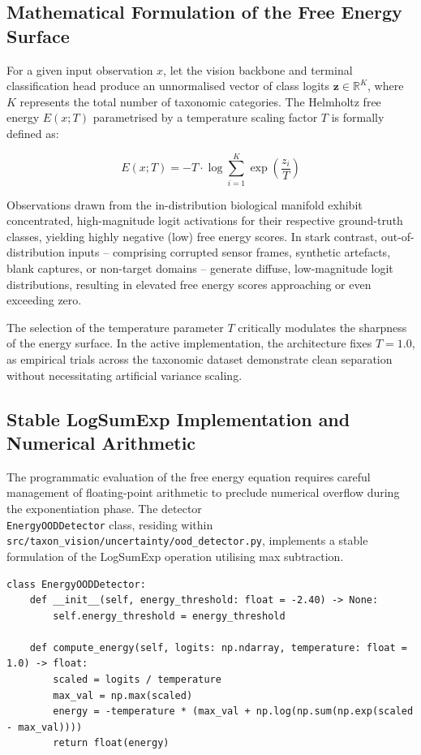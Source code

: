 \subsection{Mathematical Formulation of the Free Energy Surface}

For a given input observation $x$, let the vision backbone and terminal classification head produce an unnormalised vector of class logits $\mathbf{z} \in \mathbb{R}^K$, where $K$ represents the total number of taxonomic categories. The Helmholtz free energy $E(x; T)$ parametrised by a temperature scaling factor $T$ is formally defined as:

\begin{equation}
    E(x; T) = -T \cdot \log \sum_{i=1}^K \exp\left(\frac{z_i}{T}\right)
\end{equation}

Observations drawn from the in-distribution biological manifold exhibit concentrated, high-magnitude logit activations for their respective ground-truth classes, yielding highly negative (low) free energy scores. In stark contrast, out-of-distribution inputs -- comprising corrupted sensor frames, synthetic artefacts, blank captures, or non-target domains -- generate diffuse, low-magnitude logit distributions, resulting in elevated free energy scores approaching or even exceeding zero.

The selection of the temperature parameter $T$ critically modulates the sharpness of the energy surface. In the active implementation, the architecture fixes $T = 1.0$, as empirical trials across the taxonomic dataset demonstrate clean separation without necessitating artificial variance scaling.



\subsection{Stable LogSumExp Implementation and Numerical Arithmetic}

The programmatic evaluation of the free energy equation requires careful management of floating-point arithmetic to preclude numerical overflow during the exponentiation phase. The detector\\\texttt{EnergyOODDetector} class, residing within \texttt{src/taxon\_vision/uncertainty/ood\_detector.py}, implements a stable formulation of the LogSumExp operation utilising max subtraction.

\begin{listing}[htbp]
\begin{verbatim}
class EnergyOODDetector:
    def __init__(self, energy_threshold: float = -2.40) -> None:
        self.energy_threshold = energy_threshold

    def compute_energy(self, logits: np.ndarray, temperature: float = 1.0) -> float:
        scaled = logits / temperature
        max_val = np.max(scaled)
        energy = -temperature * (max_val + np.log(np.sum(np.exp(scaled - max_val))))
        return float(energy)
\end{verbatim}
\caption{Numerically stable free energy computation implemented via NumPy.}
\label{lst:compute_energy}
\end{listing}

